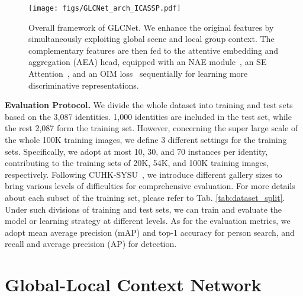 \documentclass{article}
\def\ourmodel{GLCNet}
\begin{document}
\begin{figure*}[t]
  \centering
\texttt{[image: figs/GLCNet\_arch\_ICASSP.pdf]}
   \vspace{-4mm}
   \caption{Overall framework of \ourmodel{}.
We enhance the original features by simultaneously exploiting global scene and local group context. The complementary features are then fed to the attentive embedding and aggregation (AEA) head, equipped with an NAE module~\cite{NAE}, an SE Attention~\cite{SEAttention}, and an OIM loss~\cite{OIM} sequentially for learning more discriminative representations.}
   \vspace{-2mm}
   \label{fig:GLCNet}
\end{figure*}






\textbf{Evaluation Protocol.} We divide the whole dataset into training and test sets based on the 3,087 identities. 1,000 identities are included in the test set, while the rest 2,087 form the training set. However, concerning the super large scale of the whole 100K training images, we define 3 different settings for the training sets. Specifically, we adopt at most 10, 30, and 70 instances per identity, contributing to the training sets of 20K, 54K, and 100K training images, respectively. Following CUHK-SYSU~\cite{OIM}, we introduce different gallery sizes to bring various levels of difficulties for comprehensive evaluation. For more details about each subset of the training set, please refer to Tab. \ref{tab:dataset_split}.
Under such divisions of training and test sets, we can train and evaluate the model or learning strategy at different levels. As for the evaluation metrics, we adopt mean average precision (mAP) and top-1 accuracy for person search, and recall and average precision (AP) for detection.


\section{Global-Local Context Network}
\label{sec:method}
\end{document}
